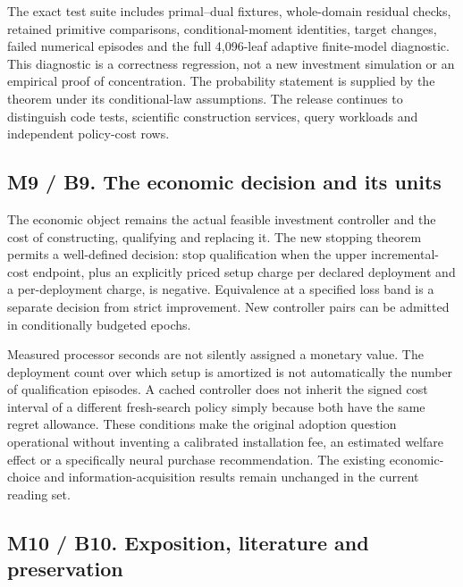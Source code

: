 The exact test suite includes primal--dual fixtures, whole-domain
residual checks, retained primitive comparisons, conditional-moment
identities, target changes, failed numerical episodes and the full
4,096-leaf adaptive finite-model diagnostic. This diagnostic is a
correctness regression, not a new investment simulation or an empirical
proof of concentration. The probability statement is supplied by the
theorem under its conditional-law assumptions. The release continues to
distinguish code tests, scientific construction services, query
workloads and independent policy-cost rows.

\hypertarget{m9-b9.-the-economic-decision-and-its-units}{%
\subsection{M9 / B9. The economic decision and its
units}\label{m9-b9.-the-economic-decision-and-its-units}}

The economic object remains the actual feasible investment controller
and the cost of constructing, qualifying and replacing it. The new
stopping theorem permits a well-defined decision: stop qualification
when the upper incremental-cost endpoint, plus an explicitly priced
setup charge per declared deployment and a per-deployment charge, is
negative. Equivalence at a specified loss band is a separate decision
from strict improvement. New controller pairs can be admitted in
conditionally budgeted epochs.

Measured processor seconds are not silently assigned a monetary value.
The deployment count over which setup is amortized is not automatically
the number of qualification episodes. A cached controller does not
inherit the signed cost interval of a different fresh-search policy
simply because both have the same regret allowance. These conditions
make the original adoption question operational without inventing a
calibrated installation fee, an estimated welfare effect or a
specifically neural purchase recommendation. The existing
economic-choice and information-acquisition results remain unchanged in
the current reading set.

\hypertarget{m10-b10.-exposition-literature-and-preservation}{%
\subsection{M10 / B10. Exposition, literature and
preservation}\label{m10-b10.-exposition-literature-and-preservation}}

